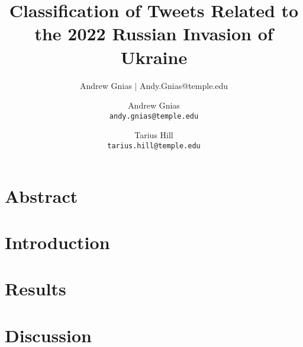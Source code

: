 \documentclass[12pt,letterpaper,oneside,titlepage]{article}
\title{Classification of Tweets Related to the 2022 Russian Invasion of Ukraine}
\author{Andrew Gnias $|$ Andy.Gnias@temple.edu}
\author{
  Andrew Gnias \\
  \texttt{andy.gnias@temple.edu}
  \and
  Tarius Hill \\
  \texttt{tarius.hill@temple.edu}
}
\begin{document}
\maketitle

\section{Abstract}\label{sec:abstract}

\section{Introduction}\label{sec:introduction}

\section{Results}\label{sec:results}

\section{Discussion}\label{sec:discussion}

\pagebreak

\printbibliography
\end{document}
